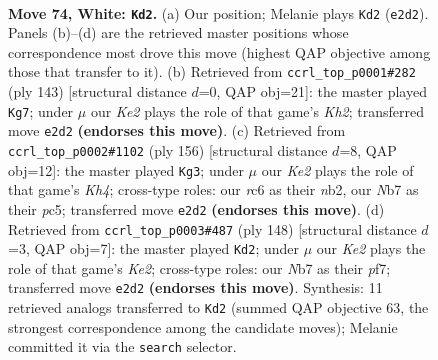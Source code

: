 \documentclass[11pt]{article}
\begin{document}
\clearpage

\begin{figure}[p]\centering
\begin{subfigure}{0.46\textwidth}\centering
\resizebox{\linewidth}{!}{%
\newchessgame
\chessboard[
  setfen={7k/1NP5/2r5/8/8/6B1/4K3/8 w - - 61 74},
  showmover=false,
  pgfstyle=straightmove, color=movearrow, markmove={e2-d2}
]}
\caption{}
\end{subfigure}\hfill
\begin{subfigure}{0.46\textwidth}\centering
\resizebox{\linewidth}{!}{%
\newchessgame
\chessboard[
  setfen={8/7k/3n4/3b4/1R6/1p6/5K2/8 b - - 17 72},
  showmover=false,
  pgfstyle=straightmove, color=movearrow, markmove={h7-g7}
]}
\caption{}
\end{subfigure}
\\[4pt]
\begin{subfigure}{0.46\textwidth}\centering
\resizebox{\linewidth}{!}{%
\newchessgame
\chessboard[
  setfen={8/4k3/B7/2p5/2P4K/8/1n6/8 w - - 9 79},
  showmover=false,
  pgfstyle=straightmove, color=movearrow, markmove={h4-g3}
]}
\caption{}
\end{subfigure}\hfill
\begin{subfigure}{0.46\textwidth}\centering
\resizebox{\linewidth}{!}{%
\newchessgame
\chessboard[
  setfen={8/1P3p2/2B5/4k3/8/1r6/4K3/8 w - - 23 75},
  showmover=false,
  pgfstyle=straightmove, color=movearrow, markmove={e2-d2}
]}
\caption{}
\end{subfigure}
\caption{\textbf{Move 74, White: \texttt{Kd2}.} (a) Our position; Melanie plays \texttt{Kd2} (\texttt{e2d2}). Panels (b)--(d) are the retrieved master positions whose correspondence most drove this move (highest QAP objective among those that transfer to it). (b) Retrieved from \texttt{ccrl\_top\_p0001\#282} (ply 143) [structural distance $d$=0, QAP obj=21]: the master played \texttt{Kg7}; under $\mu$ our \emph{Ke2} plays the role of that game's \emph{Kh2}; transferred move \texttt{e2d2} \textbf{(endorses this move)}. (c) Retrieved from \texttt{ccrl\_top\_p0002\#1102} (ply 156) [structural distance $d$=8, QAP obj=12]: the master played \texttt{Kg3}; under $\mu$ our \emph{Ke2} plays the role of that game's \emph{Kh4}; cross-type roles: our \emph{r}c6 as their \emph{n}b2, our \emph{N}b7 as their \emph{p}c5; transferred move \texttt{e2d2} \textbf{(endorses this move)}. (d) Retrieved from \texttt{ccrl\_top\_p0003\#487} (ply 148) [structural distance $d$=3, QAP obj=7]: the master played \texttt{Kd2}; under $\mu$ our \emph{Ke2} plays the role of that game's \emph{Ke2}; cross-type roles: our \emph{N}b7 as their \emph{p}f7; transferred move \texttt{e2d2} \textbf{(endorses this move)}. Synthesis: 11 retrieved analogs transferred to \texttt{Kd2} (summed QAP objective 63, the strongest correspondence among the candidate moves); Melanie committed it via the \texttt{search} selector.}
\label{fig:thought-m146}
\end{figure}
\end{document}
